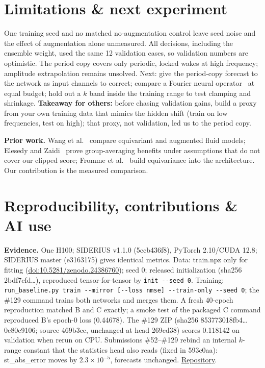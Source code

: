 \documentclass{article}
\begin{document}
\section{Limitations \& next experiment}

One training seed and no matched no-augmentation control leave seed noise and the
effect of augmentation alone unmeasured. All decisions, including the ensemble
weight, used the same 12 validation cases, so validation numbers are optimistic. The
period copy covers only periodic, locked wakes at high frequency; amplitude
extrapolation remains unsolved. Next: give the period-copy forecast to the network as input channels to
correct; compare a Fourier neural operator~\citep{li2021} at equal budget; hold out
a $k$ band inside the training range to test clamping and shrinkage. \textbf{Takeaway for others:} before chasing validation gains, build a proxy from your
own training data that mimics the hidden shift (train on low frequencies, test on
high); that proxy, not validation, led us to the period copy.

\textbf{Prior work.} Wang et al.~\citep{wang2021} compare equivariant and augmented
fluid models; Elesedy and Zaidi~\citep{elesedy2021} prove group-averaging benefits under
assumptions that do not cover our clipped score; Fromme et al.~\citep{fromme2025} build
equivariance into the architecture. Our contribution is the measured comparison.

\section{Reproducibility, contributions \& AI use}

\textbf{Evidence.} One H100; SIDERIUS v1.1.0 (5ccb436f8), PyTorch 2.10/CUDA 12.8;
SIDERIUS master (e3163175) gives identical metrics. Data: train.npz only for fitting
(\href{https://doi.org/10.5281/zenodo.24386760}{doi:10.5281/zenodo.24386760}); seed 0;
released initialization (sha256 2bdf7cfd\dots), reproduced tensor-for-tensor by
\texttt{init -{}-seed 0}. Training: \texttt{run\_baseline.py train -{}-mirror
[-{}-loss nmse] -{}-train-only -{}-seed 0}; the \#129 command trains both networks and
merges them. A fresh 40-epoch reproduction matched B and C exactly; a smoke test of
the packaged C command reproduced B's epoch-0 loss (0.44678). The \#129 ZIP (sha256 853773018fb4\dots0c80c9106; source 469b3ce,
unchanged at head 269cd38) scores 0.118142 on validation when rerun on CPU.
Submissions \#52--\#129 rebind an internal $k$-range constant that the statistics
head also reads (fixed in 593c0aa): st\_abs\_error moves by $2.3\times10^{-5}$,
forecasts unchanged.
\href{https://github.com/pranavvkrishna/GalileoHackathon-Optimus}{Repository}.
\end{document}
